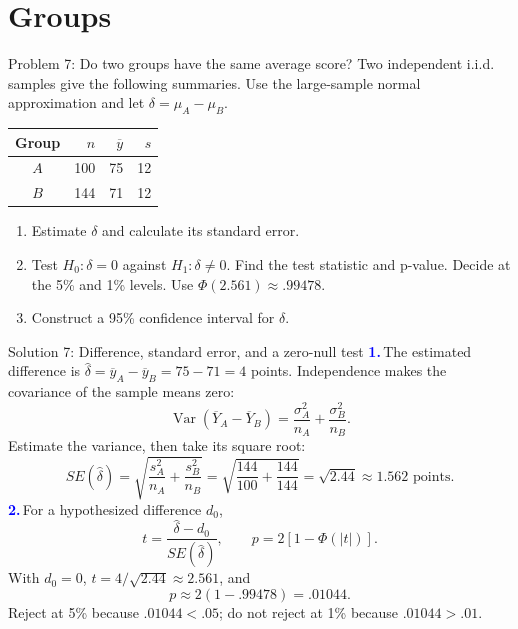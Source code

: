 \documentclass[notes,10pt, aspectratio=169]{beamer}
\newif\ifshowsolutions
\newcommand{\Var}{\operatorname{Var}}
\newcommand{\answerpart}[1]{\textcolor{blue}{\textbf{#1.}}\,}
\begin{document}
\section{Groups}

\begin{frame}{Problem 7: Do two groups have the same average score?}
Two independent i.i.d. samples give the following summaries. Use the large-sample normal approximation and let $\delta=\mu_A-\mu_B$.
\begin{center}
\begin{tabular}{c|rrr}
Group & $n$ & $\overline y$ & $s$\\ \hline
$A$ & 100 & 75 & 12\\
$B$ & 144 & 71 & 12
\end{tabular}
\end{center}
\begin{enumerate}
\setlength{\itemsep}{5pt}
\item Estimate $\delta$ and calculate its standard error.
\item Test $H_0:\delta=0$ against $H_1:\delta\neq0$. Find the test statistic and p-value. Decide at the 5\% and 1\% levels. Use $\Phi(2.561)\approx.99478$.
\item Construct a 95\% confidence interval for $\delta$.
\end{enumerate}
\end{frame}

\ifshowsolutions
\begin{frame}{Solution 7: Difference, standard error, and a zero-null test}
\small
\answerpart{1}The estimated difference is $\widehat\delta=\overline y_A-\overline y_B=75-71=\boxed4$ points.
Independence makes the covariance of the sample means zero:
\[
\Var(\overline Y_A-\overline Y_B)
=\frac{\sigma_A^2}{n_A}+\frac{\sigma_B^2}{n_B}.
\]
Estimate the variance, then take its square root:
\[
SE(\widehat\delta)
=\sqrt{\frac{s_A^2}{n_A}+\frac{s_B^2}{n_B}}
=\sqrt{\frac{144}{100}+\frac{144}{144}}
=\sqrt{2.44}\approx\boxed{1.562}\text{ points}.
\]
\answerpart{2}For a hypothesized difference $d_0$,
\[
t=\frac{\widehat\delta-d_0}{SE(\widehat\delta)},
\qquad p=2[1-\Phi(|t|)].
\]
With $d_0=0$, $t=4/\sqrt{2.44}\approx2.561$, and
\[
p\approx2(1-.99478)=\boxed{.01044}.
\]
Reject at 5\% because $.01044<.05$; do not reject at 1\% because $.01044>.01$.
\end{frame}
\end{document}
